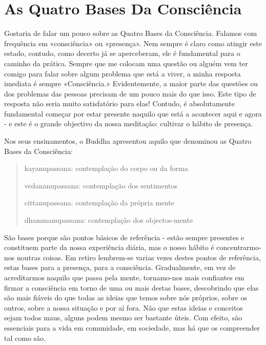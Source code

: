 \chapter{As Quatro Bases Da Consciência}

Gostaria de falar um pouco sobre as Quatro Bases da Consciência. Falamos
com frequência em «consciência» ou «presença». Nem sempre é claro como
atingir este estado, contudo, como decerto já se aperceberam, ele é
fundamental para o caminho da prática. Sempre que me colocam uma questão
ou alguém vem ter comigo para falar sobre algum problema que está a
viver, a minha resposta imediata é sempre «Consciência.» Evidentemente,
a maior parte das questões ou dos problemas das pessoas precisam de um
pouco mais do que isso. Este tipo de resposta não seria muito
satisfatório para elas! Contudo, é absolutamente fundamental começar por
estar presente naquilo que está a acontecer aqui e agora - e este é o
grande objectivo da nossa meditação: cultivar o hábito de presença.

Nos seus ensinamentos, o Buddha apresentou aquilo que denominou as
Quatro Bases da Consciência:

\begin{quote}
  kayanupassana: contemplação do corpo ou da forma

  vedananupassana: contemplação dos sentimentos

  cittanupassana: contemplação da própria mente

  dhammanupassana: contemplação dos objectos-mente
\end{quote}

São bases porque são pontos básicos de referência - estão sempre
presentes e constituem parte da nossa experiência diária, mas o nosso
hábito é concentrarmo-nos noutras coisas. Em retiro lembrem-se varias
vezes destes pontos de referência, estas bases para a presença, para a
consciência. Gradualmente, em vez de acreditarmos naquilo que passa pela
mente, tornamo-nos mais confiantes em firmar a consciência em torno de
uma ou mais destas bases, descobrindo que elas são mais fiáveis do que
todas as ideias que temos sobre nós próprios, sobre os outros, sobre a
nossa situação e por aí fora. Não que estas ideias e conceitos sejam
todos maus, alguns podem mesmo ser bastante úteis. Com efeito, são
essenciais para a vida em comunidade, em sociedade, mas há que os
compreender tal como são.

